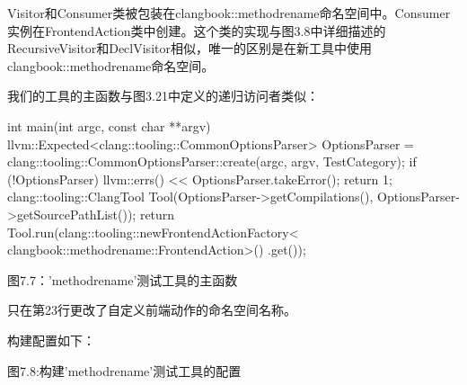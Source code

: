 Visitor和Consumer类被包装在clangbook::methodrename命名空间中。Consumer实例在FrontendAction类中创建。这个类的实现与图3.8中详细描述的RecursiveVisitor和DeclVisitor相似，唯一的区别是在新工具中使用clangbook::methodrename命名空间。


我们的工具的主函数与图3.21中定义的递归访问者类似：

\begin{cpp}
int main(int argc, const char **argv) {
  llvm::Expected<clang::tooling::CommonOptionsParser> OptionsParser =
    clang::tooling::CommonOptionsParser::create(argc, argv, TestCategory);
  if (!OptionsParser) {
    llvm::errs() << OptionsParser.takeError();
    return 1;
  }
  clang::tooling::ClangTool Tool(OptionsParser->getCompilations(),
                                 OptionsParser->getSourcePathList());
   return Tool.run(clang::tooling::newFrontendActionFactory<
                   clangbook::methodrename::FrontendAction>()
                   .get());
}
\end{cpp}

\begin{center}
图7.7：'methodrename'测试工具的主函数
\end{center}

只在第23行更改了自定义前端动作的命名空间名称。

构建配置如下：


\begin{center}
图7.8:构建'methodrename'测试工具的配置
\end{center}

